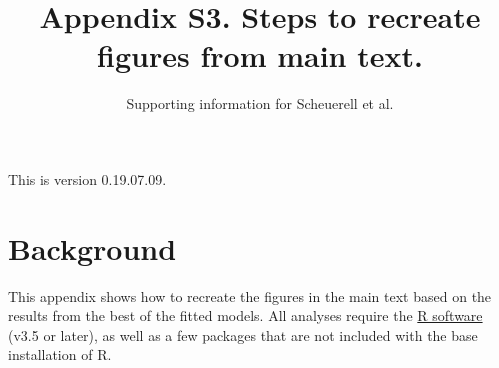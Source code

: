 \documentclass[11pt,]{article}
\title{Appendix S3. Steps to recreate figures from main text.}
\subtitle{Supporting information for Scheuerell et al.}
\author{}
\date{}
\begin{document}
\maketitle

{
\setcounter{tocdepth}{3}
\tableofcontents
}
\vspace{0.2in}

This is version 0.19.07.09.

\hypertarget{background}{%
\section{Background}\label{background}}

This appendix shows how to recreate the figures in the main text based
on the results from the best of the fitted models. All analyses require
the \href{https://cran.r-project.org/}{R software} (v3.5 or later), as
well as a few packages that are not included with the base installation
of R.
\end{document}
